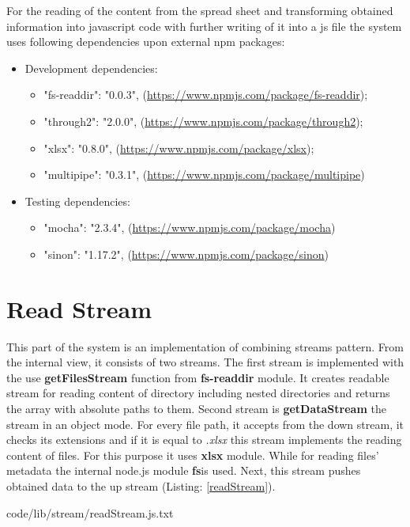 For the reading of the content from the spread sheet and transforming obtained information into javascript code with further writing of it into a js file the system uses following dependencies upon external npm packages:
\begin{itemize}
	\item Development dependencies:
	\begin{itemize}
		\item  "fs-readdir": "0.0.3", (\url{https://www.npmjs.com/package/fs-readdir});
		\item "through2": "2.0.0", (\url{https://www.npmjs.com/package/through2});
		\item "xlsx": "0.8.0", (\url{https://www.npmjs.com/package/xlsx});
		\item "multipipe": "0.3.1", (\url{https://www.npmjs.com/package/multipipe})
	\end{itemize}
	\item Testing dependencies:
	\begin{itemize}
		\item "mocha": "2.3.4", (\url{https://www.npmjs.com/package/mocha})
		\item "sinon": "1.17.2", (\url{https://www.npmjs.com/package/sinon})
	\end{itemize}
\end{itemize}

\section{Read Stream}
\label{sec:read}
This part of the system is an implementation of combining streams pattern. From the internal view, it consists of two streams.  The first stream is implemented with the use  \textbf{getFilesStream} function from\textbf{ fs-readdir} module. It creates readable stream for reading content of directory including nested directories and returns the array with absolute paths to them.
Second stream is \textbf{getDataStream} the stream in an object mode. For every file path, it accepts from the down stream, it checks its extensions and if it is equal to \textit{.xlsx} this stream implements the reading content of files. For this purpose it uses \textbf{xlsx} module. While for reading files' metadata the internal node.js module \textbf{fs}is used. Next, this stream pushes obtained data to the up stream (Listing: \ref{readStream}).
 

{code/lib/stream/readStream.js.txt}

